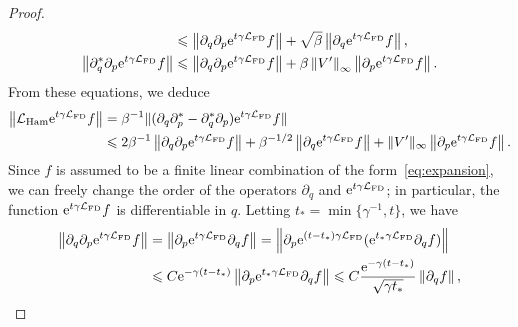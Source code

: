\documentclass[11pt,a4paper]{article}
\begin{document}
\begin{proof}
\begin{align*}
        &\leq \norm{\partial_q \partial_p \e^{t \gamma \mathcal L_{\rm FD}} f} + \sqrt{\beta} \norm{\partial_q \e^{t \gamma \mathcal L_{\rm FD}} f}, \\
        \norm{\partial_q^* \partial_p \e^{t \gamma \mathcal L_{\rm FD}} f}
        &\leq \norm{\partial_q \partial_p \e^{t \gamma \mathcal L_{\rm FD}} f}
        + \beta \norm{V'}[\infty] \norm{\partial_p \e^{t \gamma \mathcal L_{\rm FD}} f}.
    \end{align*}
    From these equations, we deduce
    \begin{align}
        \notag
        \norm{\mathcal L_{\rm Ham} \e^{t \gamma \mathcal L_{\rm FD}} f}
        &= \beta^{-1} \lVert (\partial_q \partial_p^* - \partial_q^* \partial_p) \e^{t \gamma \mathcal L_{\rm FD}} f \rVert \\
        \label{eq:reasoning_action_lham}
        &\leq 2 \beta^{-1} \norm{\partial_q \partial_p \e^{t \gamma \mathcal L_{\rm FD}} f}
        + \beta^{-1/2} \norm{\partial_q \e^{t \gamma \mathcal L_{\rm FD}} f}
        + \norm*{V'}[\infty] \norm{\partial_p \e^{t \gamma \mathcal L_{\rm FD}} f}.
    \end{align}
    Since $f$ is assumed to be a finite linear combination of the form~\eqref{eq:expansion},
    we can freely change the order of the operators $\partial_q$ and $\mathrm{e}^{t \gamma \mathcal L_{\rm FD}}$;
    in particular, the function $\mathrm{e}^{t \gamma \mathcal L_{\rm FD}} f$ is differentiable in $q$.
    Letting $t_* = \min\{ \gamma^{-1}, t\}$, we have
    \begin{align*}
        \norm{\partial_q \partial_p \e^{t \gamma \mathcal L_{\rm FD}} f}
        &= \norm{\partial_p \e^{t \gamma \mathcal L_{\rm FD}} \partial_q f}
        = \norm{\partial_p \e^{(t - t_*) \gamma \mathcal L_{\rm FD}} (\e^{t_* \gamma \mathcal L_{\rm FD}} \partial_q f)} \\
        &\leq C \e^{- \gamma (t - t_*)} \norm{\partial_p \e^{t_* \gamma \mathcal L_{\rm FD}} \partial_q f}
        \leq C \frac{\e^{- \gamma (t - t_*)}}{\sqrt{\gamma t_*}} \norm{\partial_q f},

\end{align*}
\end{proof}
\end{document}
